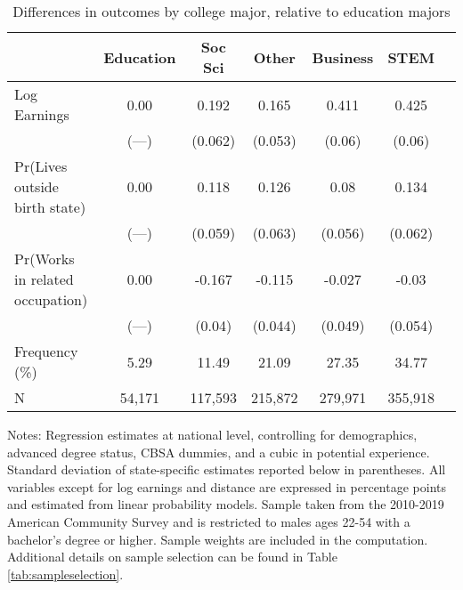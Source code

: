 \begin{table}[ht]
\caption{Differences in outcomes by college major, relative to education majors}
\label{tab:samplemeans}
\centering
\begin{threeparttable}
\begin{tabular}{lcccccc}
\toprule
                                & Education & Soc Sci & Other   & Business & STEM     \\
\midrule
Log Earnings                    & 0.00      & 0.192   & 0.165   & 0.411   & 0.425    \\
                                & (---)      & (0.062)   & (0.053)   & (0.06)   & (0.06)    \\
Pr(Lives outside birth state)   & 0.00      & 0.118   & 0.126   & 0.08   & 0.134    \\
                                & (---)      & (0.059)   & (0.063)   & (0.056)   & (0.062)    \\
Pr(Works in related occupation) & 0.00      & -0.167   & -0.115   & -0.027   & -0.03    \\
                                & (---)      & (0.04)   & (0.044)   & (0.049)   & (0.054)    \\
\midrule
Frequency (\%)                  & 5.29   & 11.49   & 21.09   & 27.35   & 34.77 \\ 
N                               & 54,171 & 117,593 & 215,872 & 279,971 & 355,918 \\ 
\bottomrule
\end{tabular}
{\footnotesize {\raggedright Notes: Regression estimates at national level, controlling for demographics, advanced degree status, CBSA dummies, and a cubic in potential experience. Standard deviation of state-specific estimates reported below in parentheses. All variables except for log earnings and distance are expressed in percentage points and estimated from linear probability models. Sample taken from the 2010-2019 American Community Survey and is restricted to males ages 22-54 with a bachelor's degree or higher. Sample weights are included in the computation. Additional details on sample selection can be found in Table \ref{tab:sampleselection}.}}
\end{threeparttable}
\end{table}
